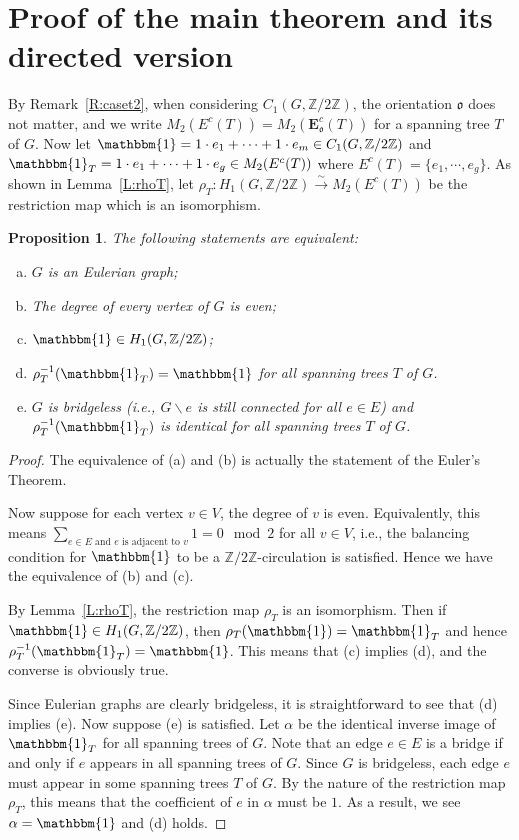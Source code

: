 \documentclass[11pt]{amsart}
\renewcommand{\setminus}{\mathbin{\backslash}}%
\theoremstyle{plain}
\newtheorem{proposition}[theorem]{Proposition}
\theoremstyle{definition}
\newcommand{\mbbZ}{{\mathbb Z}}
\newcommand{\mfrako}{{\mathfrak o}}
\newcommand{\vE}{{\mathbf E}}
\numberwithin{equation}{section}
\begin{document}
\section{Proof of the main theorem and its directed version}

By Remark~\ref{R:caset2}, when considering $C_1(G,\mbbZ/2\mbbZ)$, the orientation $\mfrako$ does not matter, and we write $M_2(E^c(T))=M_2(\vE_\mfrako^c(T))$ for a spanning tree $T$ of $G$. Now let $\mathbbm{1}= 1\cdot e_1+\cdots+1\cdot e_m \in C_1(G,\mbbZ/2\mbbZ)$ and $\mathbbm{1}_T= 1\cdot e_1+\cdots+1\cdot e_g \in M_2(E^c(T))$ where $E^c(T)=\{e_1,\cdots,e_g\}$. As shown in Lemma~\ref{L:rhoT},  let $\rho_T:H_1(G,\mbbZ/2\mbbZ) \xrightarrow{\sim} M_2(E^c(T)) $ be the restriction map which is an isomorphism. 

\begin{proposition} \label{P:eulerian}
The following statements are equivalent:
\begin{enumerate}[(a)]
\item  $G$ is an Eulerian graph;
\item The degree of every vertex of $G$ is even;
\item $\mathbbm{1}\in H_1(G,\mbbZ/2\mbbZ)$;
\item $\rho_T^{-1}(\mathbbm{1}_T)=\mathbbm{1}$ for all spanning trees $T$ of $G$. 
\item $G$ is bridgeless (i.e., $G\setminus e$ is still connected for all $e\in E$) and $\rho_T^{-1}(\mathbbm{1}_T)$ is identical for all spanning trees $T$ of $G$. 
\end{enumerate}
\end{proposition}



\begin{proof}
The equivalence of (a) and (b) is actually the statement of the Euler's Theorem. 

Now suppose for each vertex $v\in V$, the degree of $v$ is even. Equivalently, this means $\sum_{e\in E\text{ and } e \text{ is adjacent to } v} 1 = 0 \mod 2$ for all $v\in V$, i.e., the balancing condition for $\mathbbm{1}$ to be a $\mbbZ/2\mbbZ$-circulation is satisfied. Hence we have the equivalence of (b) and (c). 

By Lemma~\ref{L:rhoT}, the restriction map $\rho_T$ is an isomorphism. Then if $\mathbbm{1}\in H_1(G,\mbbZ/2\mbbZ)$, then $\rho_T(\mathbbm{1})=\mathbbm{1}_T$ and hence $\rho_T^{-1}(\mathbbm{1}_T)=\mathbbm{1}$. This means that (c) implies (d), and the converse is obviously true. 

Since Eulerian graphs are clearly bridgeless, it is straightforward to see that (d) implies (e). Now suppose (e) is satisfied. Let $\alpha$ be the identical inverse image of $\mathbbm{1}_T$ for all spanning trees of $G$. Note that an edge $e\in E$ is a bridge if and only if $e$ appears in all spanning trees of $G$. Since $G$ is bridgeless, each edge $e$ must appear in some spanning trees  $T$ of $G$. By the nature of the restriction map $\rho_T$, this means that the coefficient of $e$ in $\alpha$ must be $1$. As a result, we see $\alpha = \mathbbm{1}$ and (d) holds. 

\end{proof}
\end{document}
